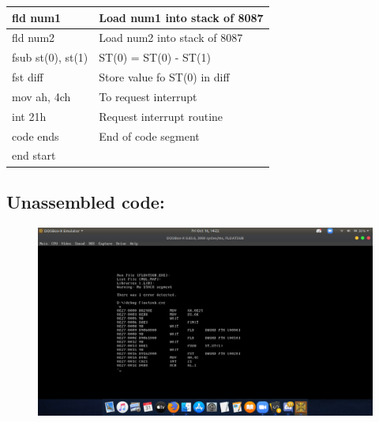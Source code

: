 \documentclass[10pt,a4paper]{article}
\begin{document}
\begin{flushleft}
\begin{table}[htb]
{\begin{tabular}{|l|l|}
\hline
fld num1                                                         & Load num1 into stack of 8087                  \\
\hline
fld num2                                                         & Load num2 into stack of 8087                  \\
\hline
fsub st(0), st(1)                                                & ST(0) = ST(0) - ST(1)                         \\
\hline
fst diff                                                         & Store value fo ST(0) in diff                  \\
\hline
mov ah, 4ch                                                      & To request interrupt                          \\
\hline
int 21h                                                          & Request interrupt routine                     \\ 
\hline
code ends                                                        & End of code segment                           \\
\hline
end start                                                        &                                               \\
\hline
\end{tabular}
}
\end{table}

\newpage
\subsection*{\textbf{Unassembled code:}}
\begin{figure}[h]
    \centering
    \includegraphics[trim = 100mm 60mm 200mm 110mm, clip, width = \textwidth]{Pics/FSUS.png}
\end{figure}

\end{flushleft}
\end{document}
